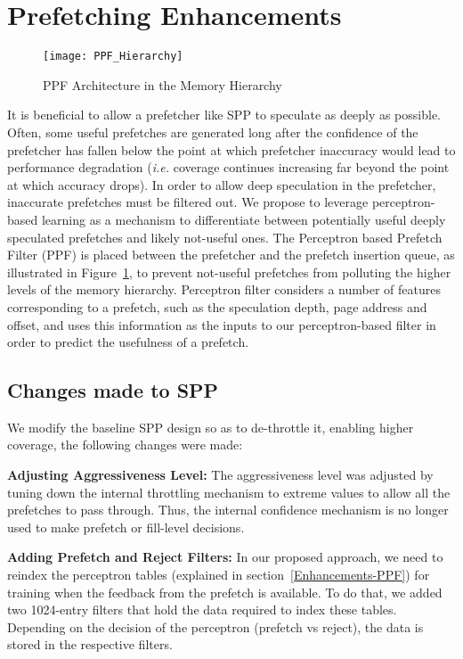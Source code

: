 \section{Prefetching Enhancements}
\label{Enhancements}

\begin{figure}
  \begin{center}
  \texttt{[image: PPF\_Hierarchy]}
  \caption{PPF Architecture in the Memory Hierarchy}
  \label{fig:PPF_Hierarchy}
  \end{center}
\end{figure}

It is beneficial to allow a prefetcher like SPP to speculate as deeply
as possible. Often, some useful prefetches are generated long after
the confidence of the prefetcher has fallen below the point at which
prefetcher inaccuracy would lead to performance degradation
(\emph{i.e.} coverage continues increasing far beyond the point at
which accuracy drops).  In order to allow deep speculation in the
prefetcher, inaccurate prefetches must be filtered out. We propose to
leverage perceptron-based learning as a mechanism to differentiate
between potentially useful deeply speculated prefetches and likely
not-useful ones. The Perceptron based Prefetch Filter (PPF) is placed
between the prefetcher and the prefetch insertion queue, as
illustrated in Figure~\ref{fig:PPF_Hierarchy}, 
to prevent not-useful prefetches from polluting the
higher levels of the memory hierarchy. Perceptron filter considers a
number of features corresponding to a prefetch, such as the
speculation depth, page address and offset, and uses this information
as the inputs to our perceptron-based filter in order to predict the
usefulness of a prefetch.

\subsection{Changes made to SPP}
\label{Enhancements-SPP}
We modify the baseline SPP design so as to de-throttle it, enabling
higher coverage, the following changes were made:

\noindent \textbf{Adjusting Aggressiveness Level:} The aggressiveness
level was adjusted by tuning down the internal throttling mechanism to
extreme values to allow all the prefetches to pass through. Thus, the
internal confidence mechanism is no longer used to make prefetch or
fill-level decisions.

\noindent \textbf{Adding Prefetch and Reject Filters:} In our proposed
approach, we need to reindex the perceptron tables (explained in
section~\ref{Enhancements-PPF}) for training when the feedback from 
the prefetch is available.  To do that, we added two 1024-entry filters 
that hold the data required to index these tables. Depending on the 
decision of the perceptron (prefetch vs reject), the data is stored 
in the respective filters.

